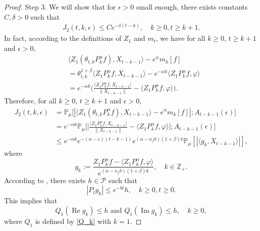 \documentclass[12pt,a4paper]{amsart}
\theoremstyle{plain}
\theoremstyle{definition}
\numberwithin{equation}{section}
\begin{document}
\begin{proof}
    Step 3.
    We will show that for $\epsilon>0$ small enough, there exists constants $C, \delta>0$ such that
    \begin{equation}\begin{split}
    \label{eq:31step3}
      J_2(t,k,\epsilon)
      \leq Ce^{-\delta (t-k)},
      \quad k\geq 0, t\geq k+1.
    \end{split}\end{equation}
    In fact, according to the definitions of $Z_1$ and $m_t$, we have for all $k\geq 0$, $t\geq k+1$ and $\epsilon> 0$,
    \begin{equation}\begin{split}
          &\langle Z_1(\theta_{t,k}P^\alpha_k f),X_{t-k-1}\rangle-e^{\alpha}m_k[f]
          \\&= \theta_{t,k}^{1+\beta} \langle Z_1P^\alpha_k f,X_{t-k-1}\rangle - e^{-\alpha k}\langle  Z_1P^\alpha_k f,\varphi\rangle
          \\&=e^{-\alpha k}\Big(\frac{\langle Z_1P^\alpha_k f ,X_{t-k-1}\rangle}{\|X_{t-k-1}\|}-\langle  Z_1P^\alpha_k f ,\varphi\rangle\Big).
    \end{split}\end{equation}
Therefore, for all $k\geq 0$, $t\geq k+1$ and $\epsilon> 0$,
\begin{equation}\begin{split}
\label{eq: prevJ2}
J_2(t,k,\epsilon)&
    = \mathbb P_\mu\big[|\langle Z_1(\theta_{t,k}P^\alpha_k f),X_{t-k-1}\rangle-e^{\alpha}m_k[f]|;A_{t-k-1}(\epsilon)\big]
    \\&=e^{-\alpha k}\mathbb{P}_{\mu}\bigg[\Big|\frac{\langle Z_1P^{\alpha}_k f,X_{t-k-1}\rangle}{\|X_{t-k-1}\|}-\langle  Z_1P^{\alpha}_k f,\varphi\rangle\Big|;A_{t-k-1}(\epsilon)\bigg]\nonumber\\
    &\leq e^{-\alpha k}e^{-(\alpha-\epsilon)(t-k-1)}e^{(\alpha-\kappa_f b)(1+\beta)k} \mathbb{P}_{\mu}\left[\left|\langle g_k,X_{t-k-1}\rangle\right|\right],
\end{split}\end{equation}
where
\[
g_k
    := \frac{Z_1 P^{\alpha}_k f-\langle  Z_1P^{\alpha}_k f,\varphi\rangle}{e^{(\alpha-\kappa_f b)(1+\beta)k}},
    \quad k \in \mathbb Z_+.
\]
According to \cite[Lemma 2.8]{MM}, there exists $h \in \mathcal P$ such that
\[
     |P_t g_k|\leq e^{-bt}h,
     \quad k\geq 0,t\geq 0.
\]
    This implies that
 \[
    Q_1 (\operatorname{Re} g_k) \leq h
    \text{ and } Q_1 (\operatorname{Im} g_k)\leq h,
    \quad k \geq 0,
 \]
    where $Q_1$ is defined by \eqref{Q_k} with $k=1$.
    

\end{proof}
\end{document}
